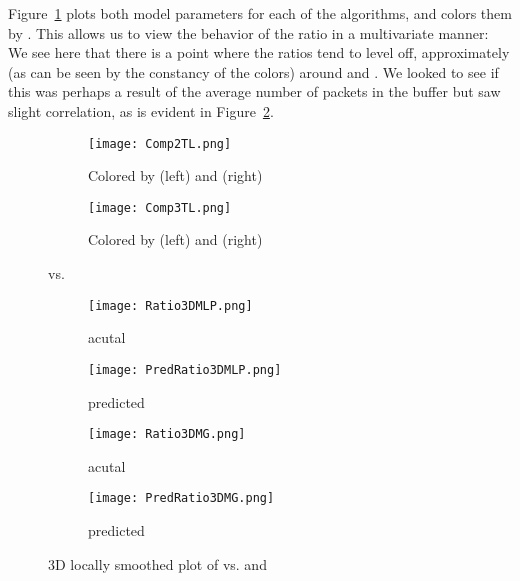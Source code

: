 \documentclass[oribibl]{llncs}
\begin{document}
\vspace{-26pt}
Figure~\ref{fig:Comp2TL} plots both model parameters for each of the algorithms, and colors them by . This allows us to view the behavior of the ratio in a multivariate manner: We see here that there is a point where the ratios tend to level off, approximately (as can be seen by the constancy of the colors) around  and . We looked to see if this was perhaps a result of the average number of packets in the buffer but saw slight correlation, as is evident in Figure~\ref{fig:Comp3TL}.



\begin{figure*}\centering

\begin{subfigure}[b]{.45\textwidth}
  \texttt{[image: Comp2TL.png]}
  \caption{Colored by (left) and (right)}
  \label{fig:Comp2TL}
\end{subfigure}
\hfill
\begin{subfigure}[b]{.45\textwidth}
  \texttt{[image: Comp3TL.png]}
  \caption{Colored by (left) and (right)}
  \label{fig:Comp3TL}
\end{subfigure}
\caption{ vs. }
\label{fig:Comp23}
\end{figure*}


\begin{figure}\centering

\begin{subfigure}{.45\textwidth}
  \centering
  \texttt{[image: Ratio3DMLP.png]}
  \caption{acutal }
  \label{fig:Ratio3DMLP}
\end{subfigure}
\hfill
\begin{subfigure}{.45\textwidth}
  \centering
  \texttt{[image: PredRatio3DMLP.png]}
  \caption{predicted }
  \label{fig:PredRatio3DMLP}
\end{subfigure}

\begin{subfigure}{.45\textwidth}
  \centering
  \texttt{[image: Ratio3DMG.png]}
  \caption{acutal  }
  \label{fig:Ratio3DMG}
\end{subfigure}
\hfill
\begin{subfigure}{.45\textwidth}
  \centering
  \texttt{[image: PredRatio3DMG.png]}
  \caption{predicted  }
  \label{fig:PredRatio3DMG}
\end{subfigure}

\caption{3D locally smoothed plot of  vs.  and }
\label{fig:3DMLP}
\end{figure}
\end{document}
